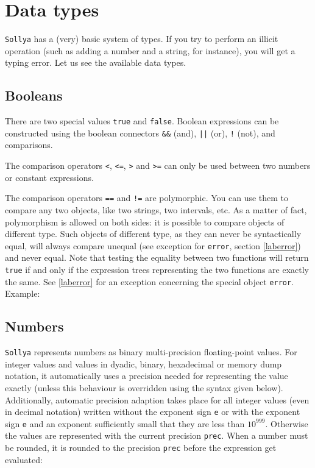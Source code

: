 \documentclass[a4paper]{article}
\newcommand{\com}[1]{\texttt{#1}}
\newcommand{\key}[1]{\texttt{#1}}
\newcommand{\sollya}{\texttt{Sollya}\xspace}
\begin{document}
\section{Data types}
\sollya has a (very) basic system of types. If you try to perform an illicit operation (such as adding a number and a string, for instance), you will get a typing error. Let us see the available data types.

\subsection{Booleans}
There are two special values \key{true} and \key{false}. Boolean expressions can be constructed using the boolean connectors \key{\&\&} (and), \key{||} (or), \key{!} (not), and comparisons.

The comparison operators \key{<}, \key{<=}, \key{>} and \key{>=} can only be used between two numbers or constant expressions.

The comparison operators \key{==} and \key{!=} are polymorphic. You can use them to compare any two objects, like two strings, two intervals, etc. As a matter of fact, polymorphism is allowed on both sides: it is possible to compare objects of different type. Such objects of different type, as they can never be syntactically equal, will always compare unequal (see exception for \key{error}, section \ref{laberror}) and never equal. Note that testing the equality between two functions will return \key{true} if and only if the expression trees representing the two functions are exactly the same. See \ref{laberror} for an exception concerning the special object \key{error}. Example:



\subsection{Numbers} \label{sec:numbers}
\sollya represents numbers as binary multi-precision floating-point values. For integer values and values in dyadic, binary, hexadecimal or memory dump notation, it 
automatically uses a precision needed for representing the value exactly (unless this behaviour is overridden using the syntax given below). Additionally, automatic precision adaption takes place for all 
integer values (even in decimal notation) written without the exponent sign \texttt{e} or with the exponent sign \texttt{e} and an exponent sufficiently 
small that they are less than $10^{999}$. Otherwise the values are represented with the current precision \com{prec}. When a number must be rounded, it is rounded to the precision \com{prec} before the expression get evaluated:
\end{document}
